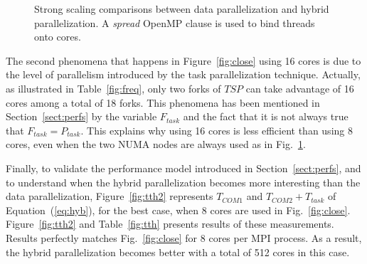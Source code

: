 \begin{figure}[!h]\begin{center}
  \caption{Strong scaling comparisons between data parallelization and hybrid parallelization. A \emph{spread} OpenMP clause is used to bind threads onto cores.}
  \label{fig:spread}
\end{center}\end{figure}

The second phenomena that happens in Figure~\ref{fig:close} using 16 cores is due to the level of parallelism introduced by the task parallelization technique. Actually, as illustrated in Table~\ref{fig:freq}, only two forks of $TSP$ can take advantage of 16 cores among a total of 18 forks. This phenomena has been mentioned in Section~\ref{sect:perfs} by the variable $F_{task}$ and the fact that it is not always true that $F_{task}=P_{task}$. This explains why using 16 cores is less efficient than using 8 cores, even when the two NUMA nodes are always used as in Fig.~\ref{fig:spread}.

Finally, to validate the performance model introduced in Section~\ref{sect:perfs}, and to understand when the hybrid parallelization becomes more interesting than the data parallelization, Figure~\ref{fig:tth2} represents $T_{COM1}$ and $T_{COM2}+T_{task}$ of Equation~(\ref{eq:hyb}), for the best case, \ie when 8 cores are used in Fig.~\ref{fig:close}.  Figure~\ref{fig:tth2} and Table~\ref{fig:tth} presents results of these measurements. Results perfectly matches Fig.~\ref{fig:close} for 8 cores per MPI process. As a result, the hybrid parallelization becomes better with a total of 512 cores in this case.

